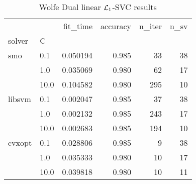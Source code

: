 \begin{table}[H]
\centering
\caption{Wolfe Dual linear $\protect \mathcal{L}_1$-SVC results}
\label{linear_dual_l1_svc_cv_results}
\begin{tabular}{llrrrr}
\toprule
       &      &  fit\_time &  accuracy &  n\_iter &  n\_sv \\
solver & C &           &           &         &       \\
\midrule
smo & 0.1  &  0.050194 &     0.985 &      33 &    38 \\
       & 1.0  &  0.035069 &     0.980 &      62 &    17 \\
       & 10.0 &  0.104582 &     0.980 &     295 &    10 \\
libsvm & 0.1  &  0.002047 &     0.985 &      37 &    38 \\
       & 1.0  &  0.002132 &     0.985 &     243 &    17 \\
       & 10.0 &  0.002683 &     0.985 &     194 &    10 \\
cvxopt & 0.1  &  0.028806 &     0.985 &       9 &    38 \\
       & 1.0  &  0.035333 &     0.980 &      10 &    17 \\
       & 10.0 &  0.039818 &     0.980 &      10 &    11 \\
\bottomrule
\end{tabular}
\end{table}
